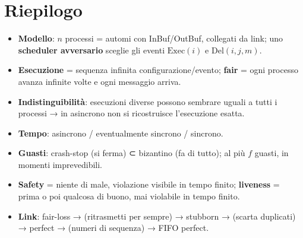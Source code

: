 \section{Riepilogo}

\begin{itemize}
\tightlist
\item
  \textbf{Modello}: \(n\) processi = automi con InBuf/OutBuf, collegati da link; uno \textbf{scheduler avversario} sceglie gli eventi \(\text{Exec}(i)\) e \(\text{Del}(i,j,m)\).
\item
  \textbf{Esecuzione} = sequenza infinita configurazione/evento; \textbf{fair} = ogni processo avanza infinite volte e ogni messaggio arriva.
\item
  \textbf{Indistinguibilità}: esecuzioni diverse possono sembrare uguali a tutti i processi → in asincrono non si ricostruisce l'esecuzione esatta.
\item
  \textbf{Tempo}: asincrono / eventualmente sincrono / sincrono.
\item
  \textbf{Guasti}: crash-stop (si ferma) ⊂ bizantino (fa di tutto); al più \(f\) guasti, in momenti imprevedibili.
\item
  \textbf{Safety} = niente di male, violazione visibile in tempo finito; \textbf{liveness} = prima o poi qualcosa di buono, mai violabile in tempo finito.
\item
  \textbf{Link}: fair-loss → (ritrasmetti per sempre) → stubborn → (scarta duplicati) → perfect → (numeri di sequenza) → FIFO perfect.
\end{itemize}
